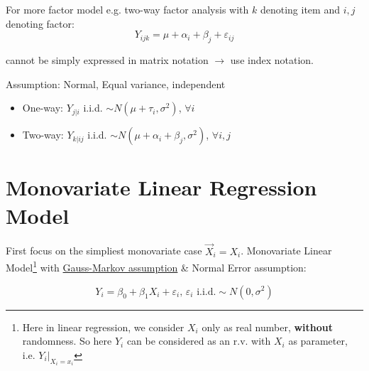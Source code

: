     For more factor model e.g. two-way factor analysis with $ k $ denoting item and $ i,j $ denoting factor:
    \begin{equation}
         Y_{ijk}=\mu +\alpha _i+\beta _j+\varepsilon  _{ij}
    \end{equation}

    cannot be simply expressed in matrix notation $ \longrightarrow $ use index notation.

    Assumption: Normal, Equal variance, independent
\begin{itemize}[topsep=2pt,itemsep=0pt]
    \item One-way: $ Y_{j|i} $ i.i.d. $ \sim N(\mu+\tau_i,\sigma ^2) $, $ \forall i $
    \item Two-way: $ Y_{k|ij} $ i.i.d. $ \sim N(\mu +\alpha _i+\beta _j,\sigma ^2) $, $ \forall i,j $
\end{itemize}


    
    


























\section{Monovariate Linear Regression Model}
    First focus on the simpliest monovariate case $ \vec{X}_i=X_i $. Monovariate Linear Model\footnote{Here in linear regression, we consider $ X_i $ only as real number, \textbf{without} randomness. So here $ Y_i $ can be considered as an r.v. with $ X_i $ as parameter, i.e. $ Y_i|_{X_i=x_i} $}
    with \hyperlink{GaussMarkovAssumption}{Gauss-Markov assumption} \& Normal Error assumption:
    
    \begin{equation}
        Y_i=\beta _0+\beta _1X_i+\varepsilon _i ,\, \varepsilon _i\text{ i.i.d.}\sim N(0,\sigma ^2) 
    \end{equation}

